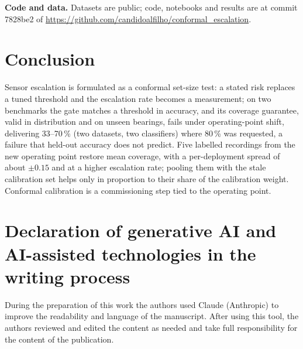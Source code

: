 \documentclass{ifacconf}
\begin{document}
\textbf{Code and data.} Datasets are public; code, notebooks and results are at commit 7828be2 of \url{https://github.com/candidoalfilho/conformal_escalation}.

\section{Conclusion}
Sensor escalation is formulated as a conformal set-size test: a stated risk replaces a tuned threshold and the escalation rate becomes a measurement; on two benchmarks the gate matches a threshold in accuracy, and its coverage guarantee, valid in distribution and on unseen bearings, fails under operating-point shift, delivering 33--70\,\% (two datasets, two classifiers) where 80\,\% was requested, a failure that held-out accuracy does not predict. Five labelled recordings from the new operating point restore mean coverage, with a per-deployment spread of about $\pm0.15$ and at a higher escalation rate; pooling them with the stale calibration set helps only in proportion to their share of the calibration weight. Conformal calibration is a commissioning step tied to the operating point.

\section*{Declaration of generative AI and AI-assisted technologies in the writing process}
During the preparation of this work the authors used Claude (Anthropic) to improve the readability and language of the manuscript. After using this tool, the authors reviewed and edited the content as needed and take full responsibility for the content of the publication.


\end{document}
